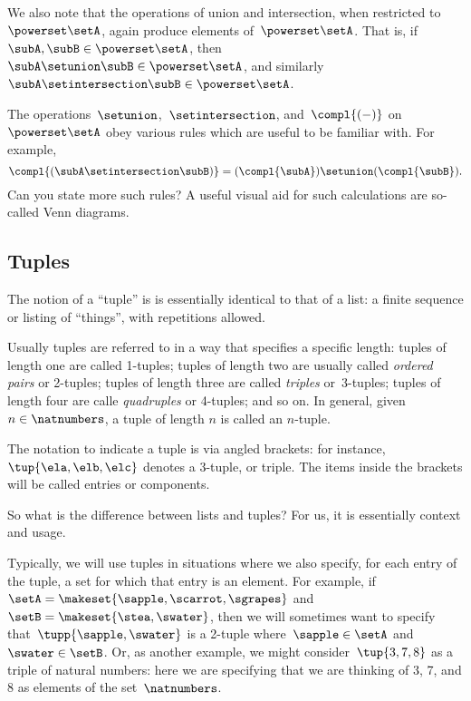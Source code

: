 We also note that the operations of union and intersection, when restricted to~$\powerset \setA$, again produce elements of~$\powerset \setA$.
That is, if~$\subA, \subB \in \powerset \setA$, then~$\subA \setunion \subB \in \powerset \setA$, and similarly~$\subA \setintersection \subB \in \powerset \setA$.

The operations~$\setunion$,~$\setintersection$, and~$\compl{( - )}$ on~$\powerset \setA$ obey various rules which are useful to be familiar with.
For example,
\begin{equation*}
    \compl{(\subA \setintersection \subB)} = (\compl{\subA}) \setunion (\compl{\subB}).
\end{equation*}
Can you state more such rules?
A useful visual aid for such calculations are so-called Venn diagrams.


\subsection{Tuples}

The notion of a ``tuple'' is is essentially identical to that of a list: a finite sequence or listing of ``things'', with repetitions allowed.

Usually tuples are referred to in a way that specifies a specific length: tuples of length one are called 1-tuples; tuples of length two are usually called \emph{ordered pairs} or 2-tuples; tuples of length three are called \emph{triples} or~3-tuples; tuples of length four are calle \emph{quadruples} or 4-tuples; and so on.
In general, given~$n \in \natnumbers$, a tuple of length $n$ is called an $n$-tuple.

The notation to indicate a tuple is via angled brackets: for instance,~$\tup{\ela, \elb, \elc}$ denotes a 3-tuple, or triple.
The items inside the brackets will be called entries or components.

So what is the difference between lists and tuples?
For us, it is essentially context and usage.

Typically, we will use tuples in situations where we also specify, for each entry of the tuple, a set for which that entry is an element.
For example, if~$\setA = \makeset{ \sapple, \scarrot, \sgrapes}$ and~$\setB = \makeset{ \stea, \swater }$, then we will sometimes want to specify that~$\tupp{\sapple, \swater}$ is a 2-tuple where~$\sapple \in \setA$ and~$\swater \in \setB$.
Or, as another example, we might consider~$\tup{3, 7, 8}$ as a triple of natural numbers: here we are specifying that we are thinking of 3, 7, and 8 as elements of the set~$\natnumbers$.

